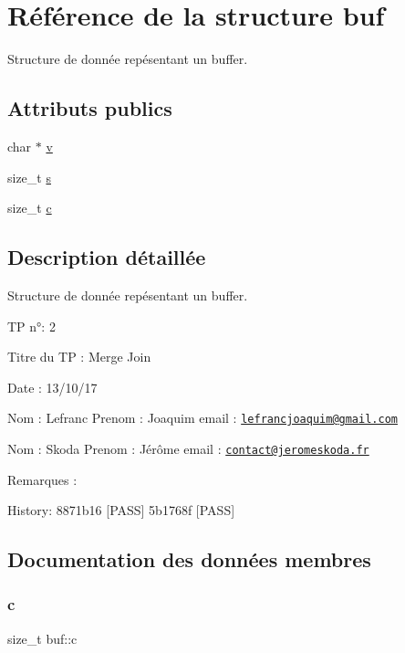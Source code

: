 \hypertarget{structbuf}{}\section{Référence de la structure buf}
\label{structbuf}


Structure de donnée repésentant un buffer.  


\subsection*{Attributs publics}
\begin{DoxyCompactItemize}
\item 
char $\ast$ \hyperlink{structbuf_a0690d33ca270683cb07fd9a1b9f4dd68}{v}
\item 
size\+\_\+t \hyperlink{structbuf_aae0f7f61347b29fa0088cbf7d952b14c}{s}
\item 
size\+\_\+t \hyperlink{structbuf_a37cf76bb775bf17b3e7566e0611428e6}{c}
\end{DoxyCompactItemize}


\subsection{Description détaillée}
Structure de donnée repésentant un buffer. 

TP n°\+: 2

Titre du TP \+: Merge Join

Date \+: 13/10/17

Nom \+: Lefranc Prenom \+: Joaquim email \+: \href{mailto:lefrancjoaquim@gmail.com}{\tt lefrancjoaquim@gmail.\+com}

Nom \+: Skoda Prenom \+: Jérôme email \+: \href{mailto:contact@jeromeskoda.fr}{\tt contact@jeromeskoda.\+fr}

Remarques \+:

History\+: 8871b16 \mbox{[}P\+A\+SS\mbox{]} 5b1768f \mbox{[}P\+A\+SS\mbox{]} 

\subsection{Documentation des données membres}
\mbox{\label{structbuf_a37cf76bb775bf17b3e7566e0611428e6}} 
\subsubsection{\texorpdfstring{c}{c}}
{\footnotesize\ttfamily size\+\_\+t buf\+::c}

